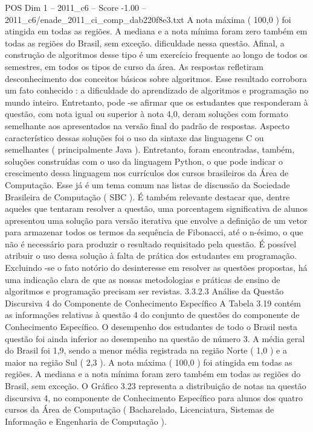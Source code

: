 \begin{textsample}{POS Dim 1 – 2011\_c6 – Score -1.00 – 2011\_c6/enade\_2011\_ci\_comp\_dab220f8e3.txt}
A nota máxima ( 100,0 ) foi atingida em todas as regiões.
A mediana e a nota mínima foram zero também em todas as regiões do Brasil, sem exceção. dificuldade nessa questão.
Afinal, a construção de algoritmos desse tipo é um exercício frequente ao longo de todos os semestres, em todos os tipos de curso da área.
As respostas refletiram desconhecimento dos conceitos básicos sobre algoritmos.
Esse resultado corrobora um fato conhecido : a dificuldade do aprendizado de algoritmos e programação no mundo inteiro.
Entretanto, pode -se afirmar que os estudantes que responderam à questão, com nota igual ou superior à nota 4,0, deram soluções com formato semelhante aos apresentados na versão final do padrão de respostas.
Aspecto característico dessas soluções foi o uso da sintaxe das linguagens C ou semelhantes ( principalmente Java ).
Entretanto, foram encontradas, também, soluções construídas com o uso da linguagem Python, o que pode indicar o crescimento dessa linguagem nos currículos dos cursos brasileiros da Área de Computação.
Esse já é um tema comum nas listas de discussão da Sociedade Brasileira de Computação ( SBC ).
É também relevante destacar que, dentre aqueles que tentaram resolver a questão, uma porcentagem significativa de alunos apresentou uma solução para versão iterativa que envolve a definição de um vetor para armazenar todos os termos da sequência de Fibonacci, até o n-ésimo, o que não é necessário para produzir o resultado requisitado pela questão.
É possível atribuir o uso dessa solução à falta de prática dos estudantes em programação.
Excluindo -se o fato notório do desinteresse em resolver as questões propostas, há uma indicação clara de que as nossas metodologias e práticas de ensino de algoritmos e programação precisam ser revistas. 3.3.2.3 Análise da Questão Discursiva 4 do Componente de Conhecimento Específico A Tabela 3.19 contém as informações relativas à questão 4 do conjunto de questões do componente de Conhecimento Específico.
O desempenho dos estudantes de todo o Brasil nesta questão foi ainda inferior ao desempenho na questão de número 3.
A média geral do Brasil foi 1,9, sendo a menor média registrada na região Norte ( 1,0 ) e a maior na região Sul ( 2,3 ).
A nota máxima ( 100,0 ) foi atingida em todas as regiões.
A mediana e a nota mínima foram zero também em todas as regiões do Brasil, sem exceção.
O Gráfico 3.23 representa a distribuição de notas na questão discursiva 4, no componente de Conhecimento Específico para alunos dos quatro cursos da Área de Computação ( Bacharelado, Licenciatura, Sistemas de Informação e Engenharia de Computação ).

\end{textsample}
